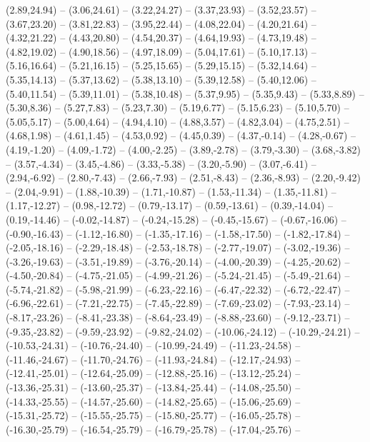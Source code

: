 {  (2.89,24.94) -- (3.06,24.61) -- (3.22,24.27) -- (3.37,23.93) -- (3.52,23.57) -- (3.67,23.20) -- (3.81,22.83) --
  (3.95,22.44) -- (4.08,22.04) -- (4.20,21.64) -- (4.32,21.22) -- (4.43,20.80) -- (4.54,20.37) -- (4.64,19.93) --
  (4.73,19.48) -- (4.82,19.02) -- (4.90,18.56) -- (4.97,18.09) -- (5.04,17.61) -- (5.10,17.13) -- (5.16,16.64) --
  (5.21,16.15) -- (5.25,15.65) -- (5.29,15.15) -- (5.32,14.64) -- (5.35,14.13) -- (5.37,13.62) -- (5.38,13.10) --
  (5.39,12.58) -- (5.40,12.06) -- (5.40,11.54) -- (5.39,11.01) -- (5.38,10.48) -- (5.37,9.95) -- (5.35,9.43) --
  (5.33,8.89) -- (5.30,8.36) -- (5.27,7.83) -- (5.23,7.30) -- (5.19,6.77) -- (5.15,6.23) -- (5.10,5.70) --
  (5.05,5.17) -- (5.00,4.64) -- (4.94,4.10) -- (4.88,3.57) -- (4.82,3.04) -- (4.75,2.51) -- (4.68,1.98) --
  (4.61,1.45) -- (4.53,0.92) -- (4.45,0.39) -- (4.37,-0.14) -- (4.28,-0.67) -- (4.19,-1.20) -- (4.09,-1.72) --
  (4.00,-2.25) -- (3.89,-2.78) -- (3.79,-3.30) -- (3.68,-3.82) -- (3.57,-4.34) -- (3.45,-4.86) -- (3.33,-5.38) --
  (3.20,-5.90) -- (3.07,-6.41) -- (2.94,-6.92) -- (2.80,-7.43) -- (2.66,-7.93) -- (2.51,-8.43) -- (2.36,-8.93) --
  (2.20,-9.42) -- (2.04,-9.91) -- (1.88,-10.39) -- (1.71,-10.87) -- (1.53,-11.34) -- (1.35,-11.81) -- (1.17,-12.27) --
  (0.98,-12.72) -- (0.79,-13.17) -- (0.59,-13.61) -- (0.39,-14.04) -- (0.19,-14.46) -- (-0.02,-14.87) -- (-0.24,-15.28) --
  (-0.45,-15.67) -- (-0.67,-16.06) -- (-0.90,-16.43) -- (-1.12,-16.80) -- (-1.35,-17.16) -- (-1.58,-17.50) -- (-1.82,-17.84) --
  (-2.05,-18.16) -- (-2.29,-18.48) -- (-2.53,-18.78) -- (-2.77,-19.07) -- (-3.02,-19.36) -- (-3.26,-19.63) -- (-3.51,-19.89) --
  (-3.76,-20.14) -- (-4.00,-20.39) -- (-4.25,-20.62) -- (-4.50,-20.84) -- (-4.75,-21.05) -- (-4.99,-21.26) -- (-5.24,-21.45) --
  (-5.49,-21.64) -- (-5.74,-21.82) -- (-5.98,-21.99) -- (-6.23,-22.16) -- (-6.47,-22.32) -- (-6.72,-22.47) -- (-6.96,-22.61) --
  (-7.21,-22.75) -- (-7.45,-22.89) -- (-7.69,-23.02) -- (-7.93,-23.14) -- (-8.17,-23.26) -- (-8.41,-23.38) -- (-8.64,-23.49) --
  (-8.88,-23.60) -- (-9.12,-23.71) -- (-9.35,-23.82) -- (-9.59,-23.92) -- (-9.82,-24.02) -- (-10.06,-24.12) -- (-10.29,-24.21) --
  (-10.53,-24.31) -- (-10.76,-24.40) -- (-10.99,-24.49) -- (-11.23,-24.58) -- (-11.46,-24.67) -- (-11.70,-24.76) -- (-11.93,-24.84) --
  (-12.17,-24.93) -- (-12.41,-25.01) -- (-12.64,-25.09) -- (-12.88,-25.16) -- (-13.12,-25.24) -- (-13.36,-25.31) -- (-13.60,-25.37) --
  (-13.84,-25.44) -- (-14.08,-25.50) -- (-14.33,-25.55) -- (-14.57,-25.60) -- (-14.82,-25.65) -- (-15.06,-25.69) -- (-15.31,-25.72) --
  (-15.55,-25.75) -- (-15.80,-25.77) -- (-16.05,-25.78) -- (-16.30,-25.79) -- (-16.54,-25.79) -- (-16.79,-25.78) -- (-17.04,-25.76) --
}
